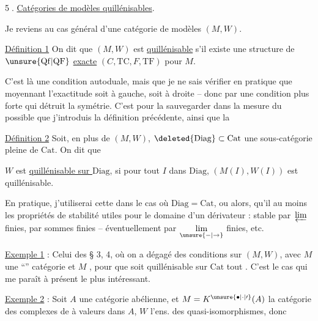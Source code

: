 \margin{[\uline{Cor.} ? Soit $\unsure{I'|II'}\overset{u}{\leftrightarrow}I$ \uline{imm. ouverte}. Alors \unsure{pour} $X\in\mathrm{ob}\,M(I)_f$, $\varprojlim_I X(i)\to\varprojlim_{I'}\unsure{\alpha|X}(i')$ est dans $F$.}

\textcircled{5}. \uline{Catégories de modèles quillénisables}.

Je reviens au cas général d'une catégorie de modèles $(M,W)$.

\llap{\raisebox{-1.75\baselineskip}[0pt][0pt]{\rule{0.4pt}{1.85\baselineskip}}\hspace{0.5em}}\uline{Définition 1} On dit que $(M,W)$ est \uline{quillénisable} s'il existe une structure de $\unsure{\mathrm{Qf}|\mathrm{QF}}$ \uline{exacte} $(C,\mathrm{TC},F,\mathrm{TF})$ pour $M$.

C'est là une condition autoduale, mais que je ne sais vérifier en pratique que moyennant l'exactitude soit à gauche, soit à droite -- donc par une condition plus forte qui détruit la symétrie. C'est pour la sauvegarder dans la mesure du possible que j'introduis la définition précédente, ainsi que la

\uline{Définition 2} Soit, en plus de $(M,W)$, $\deleted{\mathrm{Diag}}\subset\mathrm{Cat}$ une sous-catégorie pleine de $\mathrm{Cat}$. On dit que

$W$ est \uline{quillénisable sur $\mathrm{Diag}$}, si pour tout $I$ dans $\mathrm{Diag}$,  $(M(I),W(I))$ est quillénisable.



En pratique, j'utiliserai cette  dans le cas où $\mathrm{Diag}=\mathrm{Cat}$, ou alors, qu'il  au moins les propriétés de stabilité utiles pour le domaine d'un dérivateur : stable par \,$\varprojlim$ finies, par sommes finies -- éventuellement par $\underset{\unsure{-|\to}}{\lim}$ finies, etc.

\uline{Exemple \uline{1}} : Celui des § 3, 4, où on a dégagé des conditions sur $(M,W)$, avec $M$ une ``'' catégorie et $M$ , pour que  soit quillénisable sur $\mathrm{Cat}$ tout . C'est le cas qui me paraît à présent le plus intéressant.

\uline{Exemple 2} : Soit $A$ une catégorie abélienne, et $M=K^{\unsure{\bullet|\cdot|\prime}}(A)$ la catégorie des complexes de  à valeurs dans $A$, $W$ l'ens. des quasi-isomorphismes, donc

